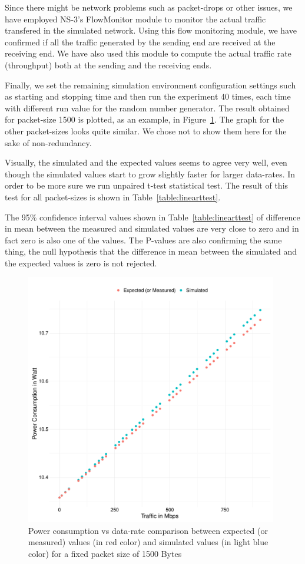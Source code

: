 Since there might be network problems such as packet-drops or other issues, we have employed NS-3's FlowMonitor module to monitor the actual traffic transfered in the simulated network. Using this flow monitoring module, we have confirmed if all the traffic generated by the sending end are received at the receiving end. We have also used this module to compute the actual traffic rate (throughput) both at the sending and the receiving ends.

Finally, we set the remaining simulation environment configuration settings such as starting and stopping time and then run the experiment 40 times, each time with different run value for the random number generator. The result obtained for packet-size 1500 is plotted, as an example, in Figure~\ref{fig:linear}. The graph for the other packet-sizes looks quite similar. We chose not to show them here for the sake of non-redundancy. 

Visually, the simulated and the expected values seems to agree very well, even though the simulated values start to grow slightly faster for larger data-rates. In order to be more sure we run unpaired t-test statistical test. The result of this test for all packet-sizes is shown in Table~\ref{table:linearttest}. 

The 95\% confidence interval values shown in Table~\ref{table:linearttest} of difference in mean between the measured and simulated values are very close to zero and in fact zero is also one of the values. The P-values are also confirming the same thing, the null hypothesis that the difference in mean between the simulated and the expected values is zero is not rejected. 

\begin{figure}[ht]
	\begin{center}
		\includegraphics[width=11cm]{images/simulatedvsexpectedlinear.pdf}
		\caption{Power consumption vs data-rate comparison between expected (or measured) values (in red color) and simulated values (in light blue color) for a fixed packet size of 1500 Bytes}
		\label{fig:linear}
	\end{center}
\end{figure}

